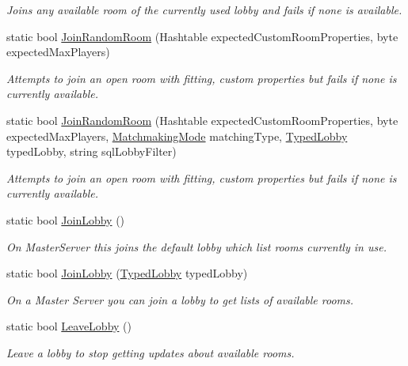 \begin{DoxyCompactItemize}
\begin{DoxyCompactList}\small\item\em Joins any available room of the currently used lobby and fails if none is available. \end{DoxyCompactList}\item 
static bool \hyperlink{class_photon_network_a08119a6962c1d179a34d0388927ead3c}{Join\+Random\+Room} (Hashtable expected\+Custom\+Room\+Properties, byte expected\+Max\+Players)
\begin{DoxyCompactList}\small\item\em Attempts to join an open room with fitting, custom properties but fails if none is currently available. \end{DoxyCompactList}\item 
static bool \hyperlink{class_photon_network_af80e5f52ce253ab5a5f81fef1435e948}{Join\+Random\+Room} (Hashtable expected\+Custom\+Room\+Properties, byte expected\+Max\+Players, \hyperlink{namespace_exit_games_1_1_client_1_1_photon_aa8150470595f719d6f62ff9467d97c7d}{Matchmaking\+Mode} matching\+Type, \hyperlink{class_typed_lobby}{Typed\+Lobby} typed\+Lobby, string sql\+Lobby\+Filter)
\begin{DoxyCompactList}\small\item\em Attempts to join an open room with fitting, custom properties but fails if none is currently available. \end{DoxyCompactList}\item 
static bool \hyperlink{class_photon_network_a62c512b8fe143fac07ff55e849aa48d5}{Join\+Lobby} ()
\begin{DoxyCompactList}\small\item\em On Master\+Server this joins the default lobby which list rooms currently in use. \end{DoxyCompactList}\item 
static bool \hyperlink{class_photon_network_a631231346113712f11319749d6e1a3eb}{Join\+Lobby} (\hyperlink{class_typed_lobby}{Typed\+Lobby} typed\+Lobby)
\begin{DoxyCompactList}\small\item\em On a Master Server you can join a lobby to get lists of available rooms. \end{DoxyCompactList}\item 
static bool \hyperlink{class_photon_network_a941ac37ca7e275c93f3a1f95f0df84ae}{Leave\+Lobby} ()
\begin{DoxyCompactList}\small\item\em Leave a lobby to stop getting updates about available rooms. \end{DoxyCompactList}\item 

\end{DoxyCompactItemize}
